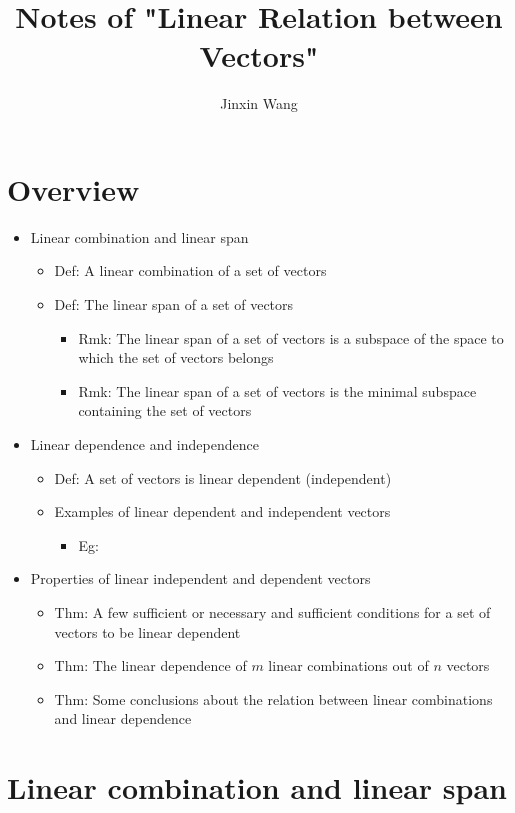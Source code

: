 \documentclass[onecolumn]{ctexart}
\title{Notes of "Linear Relation between Vectors"}
\author{Jinxin Wang}
\date{}
\begin{document}
\maketitle

\section{Overview}
\begin{itemize}
  \item Linear combination and linear span
  \begin{itemize}
    \item Def: A linear combination of a set of vectors
    \item Def: The linear span of a set of vectors
    \begin{itemize}
      \item Rmk: The linear span of a set of vectors is a subspace of the space to which the set of vectors belongs
      \item Rmk: The linear span of a set of vectors is the minimal subspace containing the set of vectors
    \end{itemize}
  \end{itemize}
  \item Linear dependence and independence
  \begin{itemize}
    \item Def: A set of vectors is linear dependent (independent)
    \item Examples of linear dependent and independent vectors
    \begin{itemize}
      \item Eg:
    \end{itemize}
  \end{itemize}
  \item Properties of linear independent and dependent vectors
  \begin{itemize}
    \item Thm: A few sufficient or necessary and sufficient conditions for a set of vectors to be linear dependent
    \item Thm: The linear dependence of $m$ linear combinations out of $n$ vectors
    \item Thm: Some conclusions about the relation between linear combinations and linear dependence
  \end{itemize}
\end{itemize}

\section{Linear combination and linear span}
\end{document}
